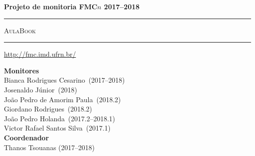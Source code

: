 \thispagestyle{empty}
\begin{center}
\Large
\parindent=0pt

\begin{flushright}
\ttfamily
\compiletime
\end{flushright}

\vspace{\stretch1}

{\bfseries\huge Projeto de monitoria FMC$n$ 2017--2018}

\vspace{5mm}

\rule{\textwidth}{2mm}

\vspace{1cm}

{\scshape\Huge AulaBook}

\vspace{1cm}

\rule{\textwidth}{2mm}

\vspace{5mm}

\url{http://fmc.imd.ufrn.br/}

\vspace{1cm}

\vspace{\stretch1}

\begin{center}
{\bfseries\sffamily Monitores}\\
Bianca Rodrigues Cesarino~(2017--2018)\\
Josenaldo Júnior~(2018)\\
João Pedro de Amorim Paula~(2018.2)\\
Giordano Rodrigues~(2018.2)\\
João Pedro Holanda~(2017.2--2018.1)\\
Victor Rafael Santos Silva~(2017.1)\\[1.5em]
{\bfseries\sffamily Coordenador}\\
Thanos Tsouanas (2017--2018)\\
\end{center}

\vspace{\stretch1}

\end{center}
